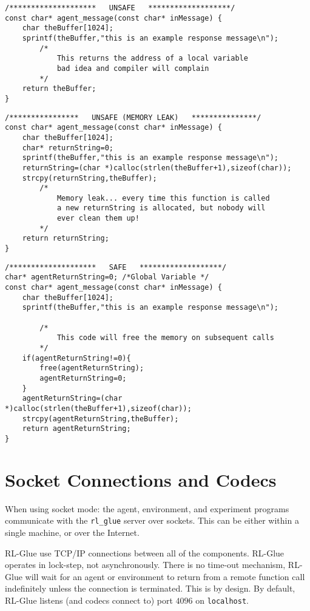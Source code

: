 \documentclass[11pt]{article}
\begin{document}
\begin{verbatim}
/********************   UNSAFE   *******************/
const char* agent_message(const char* inMessage) {
    char theBuffer[1024];
    sprintf(theBuffer,"this is an example response message\n");
        /*
            This returns the address of a local variable
            bad idea and compiler will complain
        */
    return theBuffer;
}
\end{verbatim}

\begin{verbatim}
/****************   UNSAFE (MEMORY LEAK)   ***************/
const char* agent_message(const char* inMessage) {
    char theBuffer[1024];
    char* returnString=0;
    sprintf(theBuffer,"this is an example response message\n");
    returnString=(char *)calloc(strlen(theBuffer+1),sizeof(char));
    strcpy(returnString,theBuffer);
        /*
            Memory leak... every time this function is called
            a new returnString is allocated, but nobody will
            ever clean them up!
        */
    return returnString;
}
\end{verbatim}

\begin{verbatim}
/********************   SAFE   *******************/
char* agentReturnString=0; /*Global Variable */	
const char* agent_message(const char* inMessage) {
    char theBuffer[1024];
    sprintf(theBuffer,"this is an example response message\n");

        /*
            This code will free the memory on subsequent calls
        */
    if(agentReturnString!=0){
        free(agentReturnString);
        agentReturnString=0;
    }
    agentReturnString=(char *)calloc(strlen(theBuffer+1),sizeof(char));
    strcpy(agentReturnString,theBuffer);
    return agentReturnString;
}
\end{verbatim}



\section{Socket Connections and Codecs}
When using socket mode: the agent, environment, and experiment programs communicate with the \texttt{rl\_glue} server over sockets.  This can be either within a single machine, or over the Internet.

RL-Glue use TCP/IP connections between all of the components.  RL-Glue operates in lock-step, not asynchronously.  There is no time-out mechanism, RL-Glue will wait for an agent or environment to return from a remote function call indefinitely unless the connection is terminated.  This is by design.   By default, RL-Glue listens (and codecs connect to) port $4096$ on \texttt{localhost}.
\end{document}
